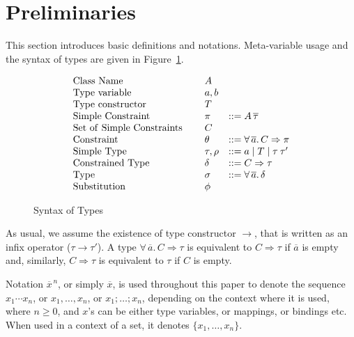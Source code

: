 \section{Preliminaries}\label{prelimirares}

This section introduces basic definitions and notations. Meta-variable
usage and the syntax of types are given in Figure~\ref{fig:meta}.  

\begin{figure} 
\[ \begin{array}[c]{llll}
{\rm Class\ Name}         &\hspace{.1cm} & A         & \\
{\rm Type\ variable}      &         & a,b & \\
{\rm Type\ constructor}   &         & T              & \\
{\rm Simple\ Constraint}  &         & \pi            & ::= A\,\overline{\tau}\\
{\rm Set\ of\ Simple\ Constraints}  &  & C           & \\
{\rm Constraint}          &         & \theta         & ::= \forall\,\overline{a}.\,C\Rightarrow\pi\\
{\rm Simple\ Type}        &         & \tau,\rho      & ::= a \mid T \mid \tau\:\tau' \\
{\rm Constrained\ Type}   &         & \delta         & ::= C\Rightarrow \tau\\
{\rm Type}                &         & \sigma         & ::= \forall\,\overline{a}.\,\delta \\
{\rm Substitution}        &         & \phi           & \\
\end{array} \]
\caption{Syntax of Types}
\label{fig:meta}
\end{figure}

As usual, we assume the existence of type constructor $\to$, that is
written as an infix operator ($\tau \to \tau'$). A type
$\forall\,\overline{a}.\,C\Rightarrow \tau$ is equivalent to
$C\Rightarrow \tau$ if $\overline{a}$ is empty and, similarly,
$C\Rightarrow \tau$ is equivalent to $\tau$ if $C$ is empty.

Notation $\overline{x}^{\,n}$, or simply $\overline{x}$, is used
throughout this paper to denote the sequence $x_1 \cdots x_n$, or
$x_1, \ldots, x_n$, or $x_1;\ldots;x_n$, depending on the context
where it is used, where $n\geq 0$, and $x$'s can be either type
variables, or mappings, or bindings etc.  When used in a context of a
set, it denotes $\{x_1,\ldots,x_n\}$.

